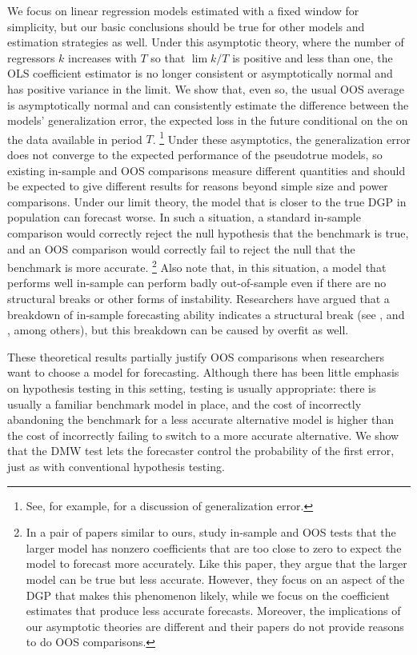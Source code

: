 \documentclass[12pt]{article}
\begin{document}
We focus on linear regression models estimated with a fixed window
for simplicity, but our basic conclusions should be true for other
models and estimation strategies as well.  Under this
asymptotic theory, where the number of regressors $k$ increases with $T$
so that $\lim k/T$ is positive and less than one,
the OLS coefficient estimator is no longer
consistent or asymptotically normal \citep{Hub:73} and has positive
variance in the limit.  We show that, even so, the usual OOS average
is asymptotically normal and can consistently estimate the difference
between the models' generalization error, the expected loss in the
future conditional on the on the data available in period
$T$.%
\footnote{See, for example, \citet{HTF:08} for a discussion of
  generalization error.} %
Under these asymptotics, the generalization
error does not converge to the expected performance of the pseudotrue
models, so existing in-sample and OOS comparisons measure different
quantities and should be expected to give different results for
reasons beyond simple size and power comparisons.  Under our limit theory,
the model that is closer to the true DGP in population can forecast
worse.  In such a situation, a standard in-sample comparison would
correctly reject the null hypothesis that the benchmark is true, and
an OOS comparison would correctly fail to reject the null that the
benchmark is more accurate.%
\footnote{In a pair of papers similar to
  ours, \citet{ClM:12,ClM:12b} study in-sample and OOS tests that
  the larger model has nonzero coefficients that are too close to zero
  to expect the model to forecast more accurately.  Like this paper,
  they argue that the larger model can be true but less accurate.
  However, they focus on an aspect of the DGP that makes this
  phenomenon likely, while we focus on the coefficient estimates that
  produce less accurate forecasts.  Moreover, the implications of our
  asymptotic theories are different and their papers do not provide
  reasons to do OOS comparisons.} %
Also note that, in this situation, a model that performs well
in-sample can perform badly out-of-sample even if there are no
structural breaks or other forms of instability.  Researchers
have argued that a breakdown of in-sample forecasting ability
indicates a structural break (see \citealp{BoH:99}, and
\citealp{StW:03}, among others), but this breakdown can be caused by
overfit as well.

These theoretical results partially justify OOS comparisons when
researchers want to
choose a model for forecasting.  Although there has been little
emphasis on hypothesis testing in this setting, testing is usually
appropriate: there is usually a familiar benchmark model in place, and
the cost of incorrectly abandoning the benchmark for a less accurate
alternative model is higher than the cost of incorrectly failing to
switch to a more accurate alternative.  We show that the DMW test
lets the forecaster control the probability of the first error, just
as with conventional hypothesis testing.
\end{document}
